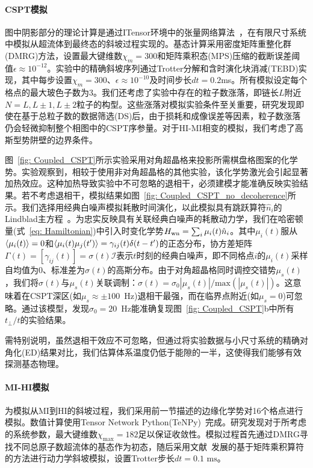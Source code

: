 \documentclass[preprint,superscriptaddress,floatfix,nofootinbib]{revtex4-2}
\begin{document}
\paragraph*{CSPT模拟} 图中阴影部分的理论计算是通过ITensor环境中的张量网络算法~\cite{itensor}，在有限尺寸系统中模拟从超流体到最终态的斜坡过程实现的。基态计算采用密度矩阵重整化群(DMRG)方法，设置最大键维数$\chi_m=300$和矩阵乘积态(MPS)压缩的截断误差阈值$\epsilon \approx 10^{-12}$。实验中的精确斜坡序列通过Trotter分解和含时演化块消减(TEBD)实现，其中每步设置$\chi_m=300$、$\epsilon \approx 10^{-10}$及时间步长$dt=0.2$ms。所有模拟设定每个格点的最大玻色子数为3。我们还考虑了实验中存在的粒子数涨落，即链长$L$附近$N=L, L\pm1, L\pm2$粒子的构型。这些涨落对模拟实验条件至关重要，研究发现即使在基于总粒子数的数据筛选(DS)后，由于损耗和成像误差等因素，粒子数涨落仍会轻微抑制整个相图中的CSPT序参量。对于HI-MI相变的模拟，我们考虑了高斯型势阱壁的边界条件。

图~\ref{fig: Coupled_CSPT}所示实验采用对角超晶格来投影所需棋盘格图案的化学势。实验观察到，相较于使用非对角超晶格的其他实验，该化学势激光会引起显著加热效应。这种加热导致实验中不可忽略的退相干，必须建模才能准确反映实验结果。若不考虑退相干，模拟结果如图~\ref{fig: Coupled_CSPT_no_decoherence}所示。我们选择用经典白噪声模拟耗散时间演化，以此模拟具有跳跃算符$\hat n_i$的Lindblad主方程~\cite{Kampen1992, Seif2022}。为忠实反映具有关联经典白噪声的耗散动力学，我们在哈密顿量(式~\eqref{eq: Hamiltonian})中引入时变化学势$H_{\rm wn}=\sum_i \mu_i(t) \hat  n_i$。其中$\mu_i(t)$服从$\braket{\mu_i(t)}=0$和$\braket{\mu_i(t)\mu_j(t')}=\gamma_{ij}(t) \delta(t-t')$的正态分布，协方差矩阵$\Gamma(t)=\left[\gamma_{ij}(t)\right]=\sigma(t)\mathcal{I}$表示$t$时刻的经典白噪声，即不同格点$i$的$\mu_i(t)$采样自均值为0、标准差为$\sigma(t)$的高斯分布。由于对角超晶格同时调控交错势$\mu_s(t)$，我们将$\sigma(t)$与$\mu_s(t)$关联调制：$\sigma(t)=\sigma_0 |\mu_s(t)|/\textrm{max}(|\mu_s(t)|)$。这意味着在CSPT深区(如$\mu_s \approx \pm 100$~Hz)退相干最强，而在临界点附近(如$\mu_s=0$)可忽略。通过该模型，发现$\sigma_0=20$~Hz能准确复现图~\ref{fig: Coupled_CSPT}b中所有$t_\perp/t$的实验结果。

需特别说明，虽然退相干效应不可忽略，但通过将实验数据与小尺寸系统的精确对角化(ED)结果对比，我们估算体系温度仍低于能隙的一半，这使得我们能够有效探测基态物理。

\paragraph*{MI-HI模拟} 为模拟从MI到HI的斜坡过程，我们采用前一节描述的边缘化学势对16个格点进行模拟。数值计算使用Tensor Network Python(TeNPy)~\cite{Hauschild18}完成。研究发现对于所考虑的系统参数，最大键维数$\chi_{\text{max}} = 182$足以保证收敛性。模拟过程首先通过DMRG寻找不同总原子数超流体的基态作为初态，随后采用文献~\cite{Zaletel2015}发展的基于矩阵乘积算符的方法进行动力学斜坡模拟，设置Trotter步长$dt = 0.1 \text{ ms}$。
\end{document}
